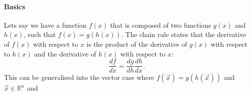         \paragraph{Basics}
        Lets say we have a function $f(x)$ that is composed of two functions $g(x)$ and $h(x)$, such that $f(x) = g(h(x))$. The chain rule states that the derivative of $f(x)$ with respect to $x$ is the product of the derivative of $g(x)$ with respect to $h(x)$ and the derivative of $h(x)$ with respect to $x$:
        \begin{equation}
            \frac{df}{dx} = \frac{dg}{dh} \frac{dh}{dx}.
        \end{equation}
        This can be generalised into the vector case where $f(\vec{x}) = g(h(\vec{x}))$ and $\vec{x} \in \mathbb{R}^n$ and 

